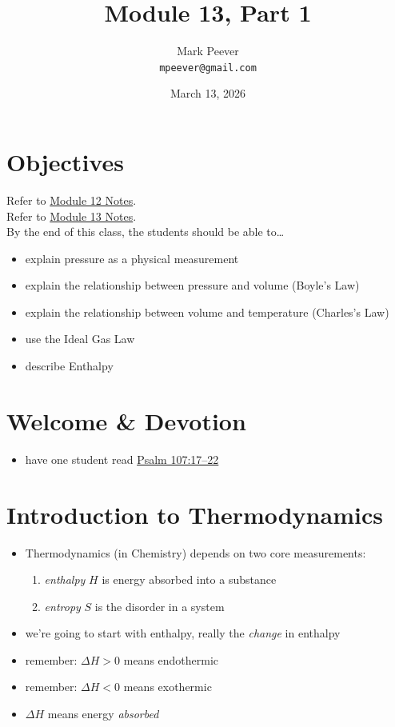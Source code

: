 \documentclass[10pt, oneside]{article}   	%
\title{Module 13, Part 1}
\author{Mark Peever\\ \texttt{mpeever@gmail.com}}
\date{March 13, 2026}
\begin{document}
\maketitle

\section*{Objectives}
Refer to \href{https://drive.google.com/file/d/1JpZKagO_RQ2Az20Uw2yLxLpzfNrq7TlN/view?usp=sharing}{Module 12 Notes}.\\
Refer to \href{https://drive.google.com/file/d/1fjlyN9yBxzAyjC-e-0vPJIUG56TnYqO6/view?usp=sharing}{Module 13 Notes}.\\

By the end of this class, the students should be able to\ldots
\begin{itemize}
\item explain pressure as a physical measurement
\item explain the relationship between pressure and volume (Boyle's Law)
\item explain the relationship between volume and temperature (Charles's Law)
\item use the Ideal Gas Law
\item describe Enthalpy
\end{itemize}

\section*{Welcome \& Devotion}
\begin{itemize}
\item have one student read \href{https://www.biblegateway.com/passage/?search=psalm\%20107\&version=LSB}{Psalm 107:17--22}
\end{itemize}


\section*{Introduction to Thermodynamics}

\begin{itemize}
\item Thermodynamics (in Chemistry) depends on two core measurements:
\begin{enumerate}
\item \emph{enthalpy} $H$ is energy absorbed into a substance
\item \emph{entropy} $S$ is the disorder in a system
\end{enumerate}
\item we're going to start with enthalpy, really the \emph{change} in enthalpy
\item remember: $\Delta H > 0$ means endothermic
\item remember: $\Delta H < 0$ means exothermic
\item $\Delta H$ means energy \emph{absorbed}
\end{itemize}
\end{document}
